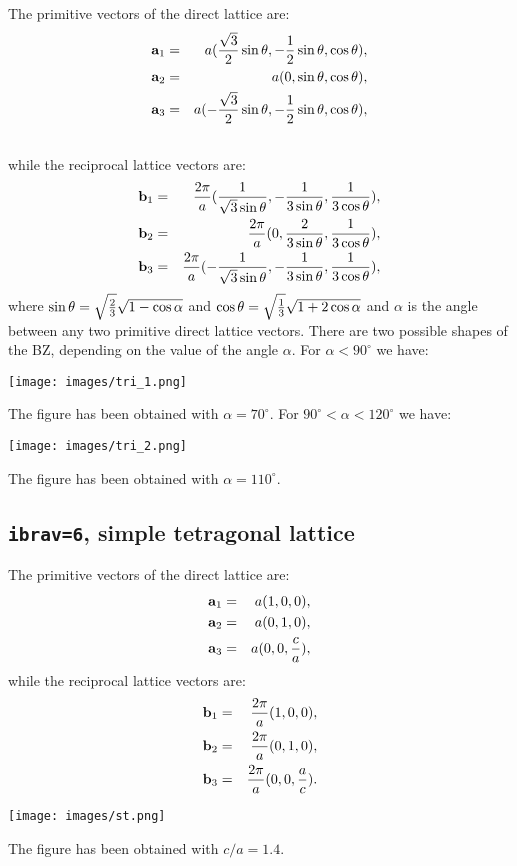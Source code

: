 \documentclass[12pt,a4paper]{article}
\begin{document}
The primitive vectors of the direct lattice are:
\begin{eqnarray}
{\bf a}_1 &=& a ({\sqrt{3}\over 2}\sin{\theta}, -{1\over 2} \sin{\theta},
          \cos{\theta}), 
\nonumber \\
{\bf a}_2 &=& a (0, \sin{\theta}, \cos{\theta}), 
\nonumber \\
{\bf a}_3 &=& a (-{\sqrt{3}\over 2} \sin{\theta}, -{1\over 2} \sin{\theta},
         \cos{\theta}), 
\nonumber \\
\nonumber
\end{eqnarray}
while the reciprocal lattice vectors are:
\begin{eqnarray}
{\bf b}_1 &=& {2\pi \over a} ({1\over \sqrt{3} \sin{\theta}}, 
-{1 \over 3 \sin{\theta}}, {1\over 3 \cos{\theta}}), \nonumber \\
{\bf b}_2 &=& {2\pi \over a} (0, 
{2 \over 3 \sin{\theta}}, {1\over 3 \cos{\theta}}), \nonumber \\
{\bf b}_3 &=& {2\pi \over a} (-{1\over \sqrt{3} \sin{\theta}}, 
-{1 \over 3 \sin{\theta}}, {1\over 3 \cos{\theta}}), \nonumber \\
\end{eqnarray}
where $\sin{\theta}=\sqrt{2\over 3}\sqrt{1-\cos{\alpha}}$
and $\cos{\theta}=\sqrt{1\over 3}\sqrt{1 + 2 \cos{\alpha}}$ and $\alpha$
is the angle between any two primitive direct lattice vectors.
There are two possible shapes of the BZ, depending on the
value of the angle $\alpha$. For $\alpha < 90^\circ$ we
have:
\begin{center}
\texttt{[image: images/tri\_1.png]}
\end{center}
The figure has been obtained with $\alpha=70^\circ$.
For $90^\circ < \alpha < 120^\circ$ we have:
\begin{center}
\texttt{[image: images/tri\_2.png]}
\end{center}
The figure has been obtained with $\alpha=110^\circ$.

\subsection{\texttt{ibrav=6}, simple tetragonal lattice}
The primitive vectors of the direct lattice are:
\begin{eqnarray}
{\bf a}_1 &=& a (1, 0, 0), \nonumber \\
{\bf a}_2 &=& a (0, 1, 0), \nonumber \\
{\bf a}_3 &=& a (0, 0, {c\over a}), \nonumber
\nonumber
\end{eqnarray}
while the reciprocal lattice vectors are:
\begin{eqnarray}
{\bf b}_1 &=& {2\pi \over a} (1, 0, 0), \nonumber \\
{\bf b}_2 &=& {2\pi \over a} (0, 1, 0), \nonumber \\
{\bf b}_3 &=& {2\pi \over a} (0, 0, {a\over c}). \nonumber
\nonumber
\end{eqnarray}
\begin{center}
\texttt{[image: images/st.png]}
\end{center}
The figure has been obtained with $c/a=1.4$.
\end{document}
